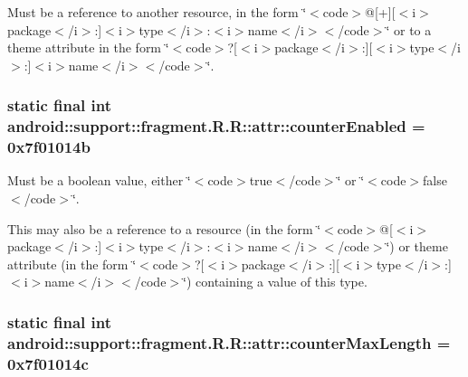 Must be a reference to another resource, in the form \char`\"{}$<$code$>$@\mbox{[}+\mbox{]}\mbox{[}$<$i$>$package$<$/i$>$:\mbox{]}$<$i$>$type$<$/i$>$:$<$i$>$name$<$/i$>$$<$/code$>$\char`\"{} or to a theme attribute in the form \char`\"{}$<$code$>$?\mbox{[}$<$i$>$package$<$/i$>$:\mbox{]}\mbox{[}$<$i$>$type$<$/i$>$:\mbox{]}$<$i$>$name$<$/i$>$$<$/code$>$\char`\"{}. \hypertarget{classandroid_1_1support_1_1fragment_1_1_r_1_1attr_c9d4bc3b7700825f7a677263a09fe540}{
\subsubsection[{counterEnabled}]{\setlength{\rightskip}{0pt plus 5cm}static final int android::support::fragment.R.R::attr::counterEnabled = 0x7f01014b}}
\label{classandroid_1_1support_1_1fragment_1_1_r_1_1attr_c9d4bc3b7700825f7a677263a09fe540}


Must be a boolean value, either \char`\"{}$<$code$>$true$<$/code$>$\char`\"{} or \char`\"{}$<$code$>$false$<$/code$>$\char`\"{}. 

This may also be a reference to a resource (in the form \char`\"{}$<$code$>$@\mbox{[}$<$i$>$package$<$/i$>$:\mbox{]}$<$i$>$type$<$/i$>$:$<$i$>$name$<$/i$>$$<$/code$>$\char`\"{}) or theme attribute (in the form \char`\"{}$<$code$>$?\mbox{[}$<$i$>$package$<$/i$>$:\mbox{]}\mbox{[}$<$i$>$type$<$/i$>$:\mbox{]}$<$i$>$name$<$/i$>$$<$/code$>$\char`\"{}) containing a value of this type. \hypertarget{classandroid_1_1support_1_1fragment_1_1_r_1_1attr_b91b382a71f1c1654e1c49154dc3abcb}{
\subsubsection[{counterMaxLength}]{\setlength{\rightskip}{0pt plus 5cm}static final int android::support::fragment.R.R::attr::counterMaxLength = 0x7f01014c}}
\label{classandroid_1_1support_1_1fragment_1_1_r_1_1attr_b91b382a71f1c1654e1c49154dc3abcb}



